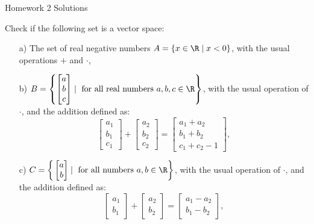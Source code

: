 \begin{center}\begin{large} Homework 2 Solutions
 \end{large}\end{center}
 \bigskip


% 


\begin{problem}[3 points]
Check if the following set is a vector space:

    \begin{enumerate}
        \item [a)] The set of real negative numbers $A = \{x\in\R \mid x < 0\}$, with the usual operations $+$ and $\cdot$,

        \item [b)] $B = \left\{ \begin{bmatrix} a \\ b \\ c\end{bmatrix} \mid \text{ for all real numbers }a, b, c\in\R\right\}$, with the usual operation of $\cdot$, and the addition defined as:
        \[ \begin{bmatrix} a_1 \\ b_1 \\ c_1\end{bmatrix} + \begin{bmatrix} a_2 \\ b_2 \\ c_2\end{bmatrix} = \begin{bmatrix} a_1 + a_2 \\ b_1 + b_2\\ c_1 + c_2 - 1\end{bmatrix} ,\]
        
        \item [c)] $C =  \bigg\{ \begin{bmatrix} a \\ b \end{bmatrix} \mid \text{ for all numbers }a,b\in\R\bigg\}$, with the usual operation of $\cdot$, and the addition defined as:
        \[ \begin{bmatrix} a_1 \\ b_1 \end{bmatrix} +\begin{bmatrix} a_2 \\ b_2 \end{bmatrix} = \begin{bmatrix} a_1-a_2 \\ b_1-b_2 \end{bmatrix} , \]


\end{enumerate}
\end{problem}
